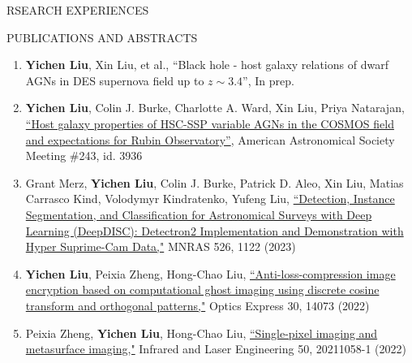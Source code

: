 \documentclass[10pt]{article} %
\begin{document}
\begin{section}{RSEARCH EXPERIENCES}
\end{section}

\begin{section}{PUBLICATIONS AND ABSTRACTS}
    
\begin{enumerate}[leftmargin=1.5em]
    \item \label{inprep}\textbf{Yichen Liu}, Xin Liu, et al., ``Black hole - host galaxy relations of dwarf AGNs in DES supernova field up to $z\sim3.4$'', In prep.
    \item \label{aas243} \textbf{Yichen Liu}, Colin J. Burke, Charlotte A. Ward, Xin Liu, Priya Natarajan, \href{https://submissions.mirasmart.com/AAS243/Itinerary/PresentationDetail.aspx?evdid=500}{``Host galaxy properties of HSC-SSP variable AGNs in the COSMOS field and expectations for Rubin Observatory''}, American Astronomical Society Meeting \#243, id. 3936
    \item \label{mnras} Grant Merz, \textbf{Yichen Liu}, Colin J. Burke, Patrick D. Aleo, Xin Liu, Matias Carrasco Kind, Volodymyr Kindratenko, Yufeng Liu, \href{https://academic.oup.com/mnras/advance-article-abstract/doi/10.1093/mnras/stad2785/7273850?redirectedFrom=fulltext}{``Detection, Instance Segmentation, and Classification for Astronomical Surveys with Deep Learning (DeepDISC): Detectron2 Implementation and Demonstration with Hyper Suprime-Cam Data,"} MNRAS 526, 1122 (2023)
    \item \label{oe} \textbf{Yichen Liu}, Peixia Zheng, Hong-Chao Liu, \href{https://opg.optica.org/oe/fulltext.cfm?uri=oe-30-9-14073&id=471300}{``Anti-loss-compression image encryption based on computational ghost imaging using discrete cosine transform and orthogonal patterns,"} Optics Express 30, 14073 (2022)
    \item \label{irla} Peixia Zheng, \textbf{Yichen Liu}, Hong-Chao Liu, \href{http://www.irla.cn/cn/article/doi/10.3788/IRLA20211058}{``Single-pixel imaging and metasurface imaging,"} Infrared and Laser Engineering 50, 20211058-1 (2022)  
\end{enumerate}

\end{section}
\end{document}
